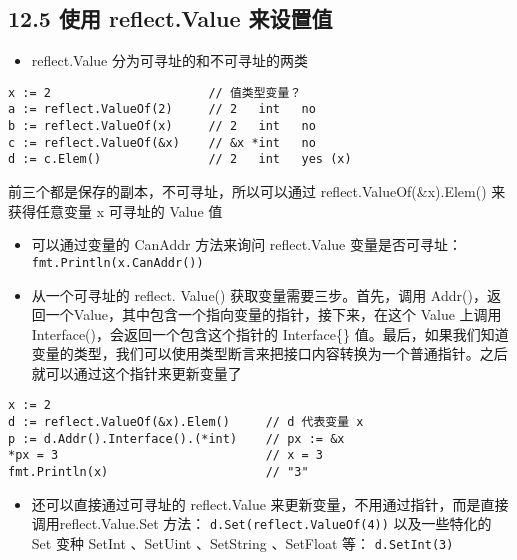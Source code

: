 \hypertarget{ux4f7fux7528-reflect.value-ux6765ux8bbeux7f6eux503c}{%
\subsection{12.5 使用 reflect.Value
来设置值}\label{ux4f7fux7528-reflect.value-ux6765ux8bbeux7f6eux503c}}

\begin{itemize}
\tightlist
\item
  reflect.Value 分为可寻址的和不可寻址的两类
\end{itemize}

\begin{verbatim}
x := 2                      // 值类型变量？
a := reflect.ValueOf(2)     // 2   int   no
b := reflect.ValueOf(x)     // 2   int   no
c := reflect.ValueOf(&x)    // &x *int   no
d := c.Elem()               // 2   int   yes (x)
\end{verbatim}

前三个都是保存的副本，不可寻址，所以可以通过 reflect.ValueOf(\&x).Elem()
来获得任意变量 x 可寻址的 Value 值

\begin{itemize}
\item
  可以通过变量的 CanAddr 方法来询问 reflect.Value 变量是否可寻址：
  \texttt{fmt.Println(x.CanAddr())}
\item
  从一个可寻址的 reflect. Value() 获取变量需要三步。首先，调用
  Addr()，返回一个Value，其中包含一个指向变量的指针，接下来，在这个
  Value 上调用 Interface()，会返回一个包含这个指针的 Interface\{\}
  值。最后，如果我们知道变量的类型，我们可以使用类型断言来把接口内容转换为一个普通指针。之后就可以通过这个指针来更新变量了
\end{itemize}

\begin{verbatim}
x := 2
d := reflect.ValueOf(&x).Elem()     // d 代表变量 x
p := d.Addr().Interface().(*int)    // px := &x
*px = 3                             // x = 3
fmt.Println(x)                      // "3"
\end{verbatim}

\begin{itemize}
\tightlist
\item
  还可以直接通过可寻址的 reflect.Value
  来更新变量，不用通过指针，而是直接调用reflect.Value.Set 方法：
  \texttt{d.Set(reflect.ValueOf(4))} 以及一些特化的 Set 变种 SetInt
  、SetUint 、SetString 、SetFloat 等： \texttt{d.SetInt(3)}
\end{itemize}

